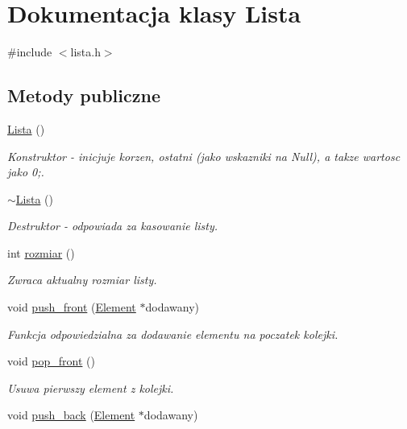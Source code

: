 \hypertarget{class_lista}{\section{Dokumentacja klasy Lista}
\label{class_lista}
}


{\ttfamily \#include $<$lista.\+h$>$}

\subsection*{Metody publiczne}
\begin{DoxyCompactItemize}
\item 
\hyperlink{class_lista_a1f668b36909182ef1360b48503529a31}{Lista} ()
\begin{DoxyCompactList}\small\item\em Konstruktor -\/ inicjuje korzen, ostatni (jako wskazniki na Null), a takze wartosc jako 0;. \end{DoxyCompactList}\item 
\hyperlink{class_lista_a4d7394b2728a00ad8404965b2e15d096}{$\sim$\+Lista} ()
\begin{DoxyCompactList}\small\item\em Destruktor -\/ odpowiada za kasowanie listy. \end{DoxyCompactList}\item 
int \hyperlink{class_lista_adc245fdc912c6d7b244441e829d8177a}{rozmiar} ()
\begin{DoxyCompactList}\small\item\em Zwraca aktualny rozmiar listy. \end{DoxyCompactList}\item 
void \hyperlink{class_lista_adb8c15c250890c28ca0c82b9143ad04c}{push\+\_\+front} (\hyperlink{struct_element}{Element} $\ast$dodawany)
\begin{DoxyCompactList}\small\item\em Funkcja odpowiedzialna za dodawanie elementu na poczatek kolejki. \end{DoxyCompactList}\item 
void \hyperlink{class_lista_a2bd4fd33a84cb42e9f8ebc7607af9db1}{pop\+\_\+front} ()
\begin{DoxyCompactList}\small\item\em Usuwa pierwszy element z kolejki. \end{DoxyCompactList}\item 
void \hyperlink{class_lista_a4b30a678ac4be084b89f0bc232d9f290}{push\+\_\+back} (\hyperlink{struct_element}{Element} $\ast$dodawany)

\end{DoxyCompactItemize}
